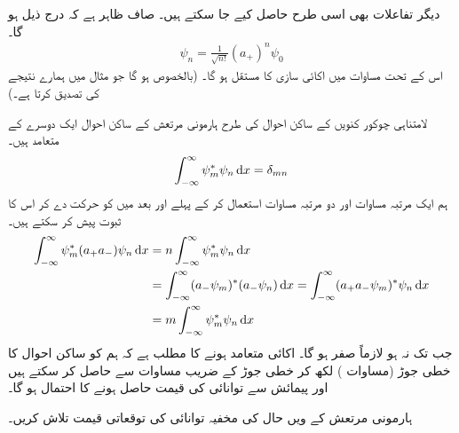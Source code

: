 دیگر تفاعلات بھی اسی طرح حاصل کیے جا سکتے ہیں۔ صاف ظاہر ہے کہ درج ذیل ہو گا۔ 
\begin{align}\label{مساوات_شروڈنگر_ہارمونی_ساکن_حالات}
\psi_n = \frac{1}{ \sqrt{n!}} ( a_+ )^n \psi_0
\end{align}
اس کے تحت مساوات  میں  اکائی سازی  کا مستقل  ہو گا۔ (بالخصوص  ہو گا جو مثال  میں ہمارے نتیجے کی تصدیق کرتا ہے۔)
 
لامتناہی چوکور کنویں کے ساکن احوال کی طرح ہارمونی مرتعش کے ساکن احوال ایک دوسرے کے متعامد ہیں۔ 
\begin{align}
\int_{ - \infty}^{ \infty} \psi_m^*\psi_n \dif x = \delta_{mn}
\end{align}
ہم ایک مرتبہ  مساوات  اور دو مرتبہ  مساوات  استعمال کر کے پہلے   اور بعد میں     کو حرکت دے کر اس کا ثبوت پیش کر سکتے ہیں۔
\begin{align*}
\int_{ - \infty}^{ \infty} \psi_m^*(a_+ a_- )\psi_n \dif x &= n \int_{ - \infty}^{ \infty} \psi_m^* \psi_n \dif x
\\
&=\int_{ - \infty}^{ \infty} ( a_- \psi_m )^*( a_- \psi_n ) \dif x = \int_{ - \infty}^{ \infty} ( a_+ a_- \psi_m)^* \psi_n \dif x\\
&= m \int_{ - \infty}^{ \infty} \psi_m^* \psi_n \dif x
\end{align*}
جب تک  نہ ہو  لازماً صفر ہو گا۔ اکائی متعامد ہونے کا مطلب ہے کہ ہم 
 کو ساکن احوال کا خطی جوڑ (مساوات )  لکھ کر خطی جوڑ کے  ضریب  مساوات  سے حاصل کر سکتے ہیں اور پیمائش سے توانائی کی قیمت  حاصل ہونے کا احتمال  ہو گا۔

ہارمونی مرتعش کے   ویں حال کی مخفیہ توانائی کی توقعاتی قیمت تلاش کریں۔

